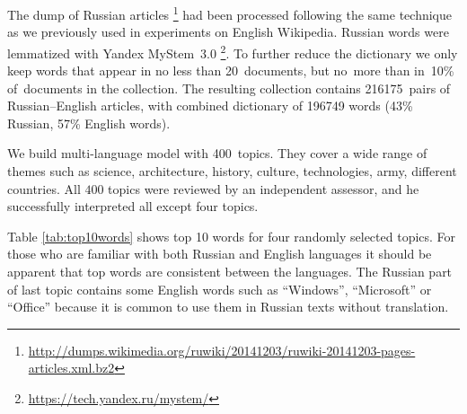 \documentclass[russian]{llncs}
\begin{document}
The dump of Russian articles%
\footnote{\url{http://dumps.wikimedia.org/ruwiki/20141203/ruwiki-20141203-pages-articles.xml.bz2}}
had been processed following the same technique as we previously used in experiments on English Wikipedia.
Russian words were lemmatized with Yandex MyStem~3.0%
\footnote{\url{https://tech.yandex.ru/mystem/}}.
To further reduce the dictionary we only keep words
that appear in no less than 20~documents, but no~more than in~10\% of~documents in the collection.
The resulting collection contains 216175~pairs of Russian--English articles, with combined dictionary
of 196749 words (43\% Russian, 57\% English words).

We build multi-language model with 400~topics.
They cover a wide range of themes such as science, architecture, history, culture, technologies, army, different countries.
All $400$ topics were reviewed by an independent assessor, 
and he successfully interpreted all except four topics.

Table \ref{tab:top10words} shows top 10 words for four randomly selected topics.
For those who are familiar with both Russian and English languages it should be apparent that top words are consistent between the languages.
The Russian part of last topic contains some English words such as
``Windows'', ``Microsoft'' or ``Office'' because it is common to use them in Russian texts without translation.
\end{document}
